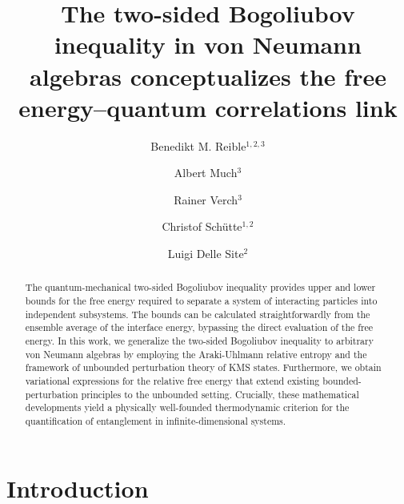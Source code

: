 \documentclass[a4paper, twoside, 11pt, reqno]{amsart}
\theoremstyle{definition}
\theoremstyle{plain}
\newcommand{\1}{\mathbf{1}}
\begin{document}
\title[The two-sided Bogoliubov inequality in von Neumann algebras]{The two-sided Bogoliubov inequality in von Neumann algebras conceptualizes the free energy--quantum correlations link}

\author[B. M. Reible]{Benedikt M. Reible$^{1,2,3}$}
\author[A. Much]{Albert Much$^{3}$}
\author[R. Verch]{Rainer Verch$^{3}$}
\author[C. Schütte]{Christof Schütte$^{1,2}$}
\author[L. Delle Site]{Luigi Delle Site$^2$}

\address{$^1$Zuse Institute Berlin, Takustr.~7, 14195 Berlin, Germany}
\address{$^2$Institute of Mathematics, Freie Universität Berlin, Arnimallee 6, 14195 Berlin, Germany}
\address{$^3$Institute of Theoretical Physics, Universität Leipzig, Brüderstr.~16, 04103 Leipzig, Germany}



\begin{abstract}
    The quantum-mechanical two-sided Bogoliubov inequality provides upper and lower bounds for the free energy required to separate a system of interacting particles into independent subsystems. The bounds can be calculated straightforwardly from the ensemble average of the interface energy, bypassing the direct evaluation of the free energy. In this work, we generalize the two-sided Bogoliubov inequality to arbitrary von Neumann algebras by employing the Araki-Uhlmann relative entropy and the framework of unbounded perturbation theory of KMS states. Furthermore, we obtain variational expressions for the relative free energy that extend existing bounded-perturbation principles to the unbounded setting. Crucially, these mathematical developments yield a physically well-founded thermodynamic criterion for the quantification of entanglement in infinite-dimensional systems.
\end{abstract}

\maketitle

\section{Introduction}
\end{document}
